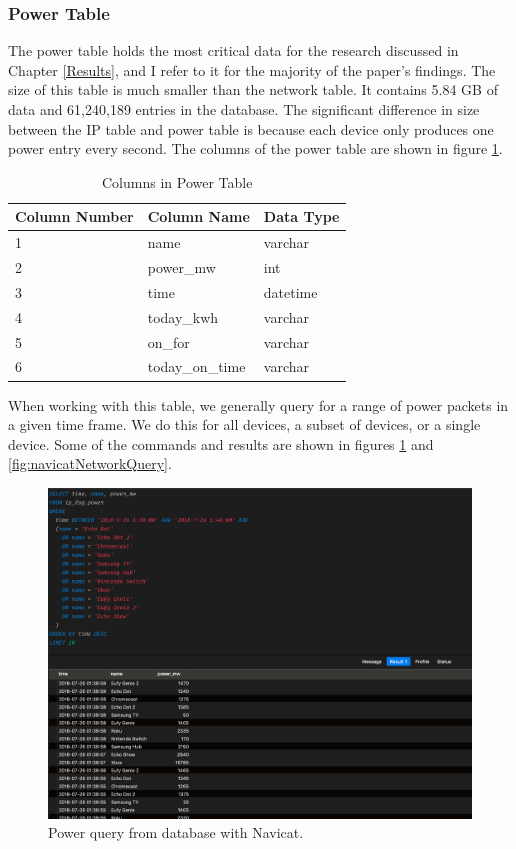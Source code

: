 \subsubsection{Power Table}

The power table holds the most critical data for the research discussed in Chapter \ref{Results}, and I refer to it for the majority of the paper's findings. The size of this table is much smaller than the network table. It contains 5.84 GB of data and 61,240,189 entries in the database. The significant difference in size between the IP table and power table is because each device only produces one power entry every second. The columns of the power table are shown in figure \ref{tab:powcol}.

\begin{table}[H]
    \centering
    \caption{Columns in Power Table}
    \begin{tabular}{@{}lll@{}}
    \toprule
    Column Number & Column Name     & Data Type \\ \midrule
    1             & name            & varchar   \\
    2             & power\_mw       & int       \\
    3             & time            & datetime  \\
    4             & today\_kwh      & varchar   \\
    5             & on\_for         & varchar   \\
    6             & today\_on\_time & varchar
    \end{tabular}
    \label{tab:powcol}
    \end{table}

When working with this table, we generally query for a range of power packets in a given time frame. We do this for all devices, a subset of devices, or a single device. Some of the commands and results are shown in figures \ref{fig:navicatPowerQuery} and \ref{fig:navicatNetworkQuery}.

\begin{figure}[H]
    \centering
    \includegraphics[width=1\textwidth]{figures/navicatPowerQuery.png}
    \caption{Power query from database with Navicat.}
    \label{fig:navicatPowerQuery}
\end{figure}

